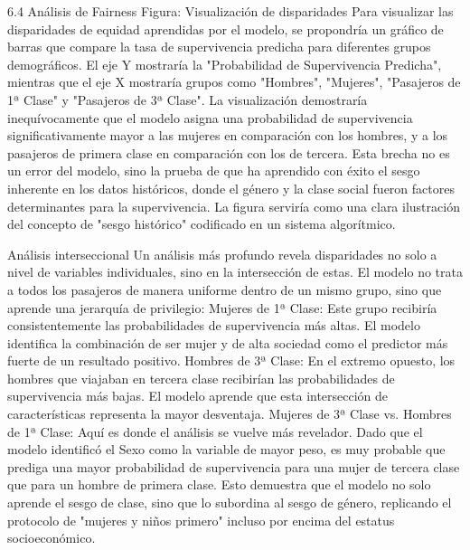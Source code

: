 \documentclass[conference]{IEEEtran}
\begin{document}
6.4 Análisis de Fairness
Figura: Visualización de disparidades
Para visualizar las disparidades de equidad aprendidas por el modelo, se propondría un gráfico de barras que compare la tasa de supervivencia predicha para diferentes grupos demográficos. El eje Y mostraría la "Probabilidad de Supervivencia Predicha", mientras que el eje X mostraría grupos como "Hombres", "Mujeres", "Pasajeros de 1ª Clase" y "Pasajeros de 3ª Clase".
La visualización demostraría inequívocamente que el modelo asigna una probabilidad de supervivencia significativamente mayor a las mujeres en comparación con los hombres, y a los pasajeros de primera clase en comparación con los de tercera. Esta brecha no es un error del modelo, sino la prueba de que ha aprendido con éxito el sesgo inherente en los datos históricos, donde el género y la clase social fueron factores determinantes para la supervivencia. La figura serviría como una clara ilustración del concepto de "sesgo histórico" codificado en un sistema algorítmico.

Análisis interseccional
Un análisis más profundo revela disparidades no solo a nivel de variables individuales, sino en la intersección de estas. El modelo no trata a todos los pasajeros de manera uniforme dentro de un mismo grupo, sino que aprende una jerarquía de privilegio:
Mujeres de 1ª Clase: Este grupo recibiría consistentemente las probabilidades de supervivencia más altas. El modelo identifica la combinación de ser mujer y de alta sociedad como el predictor más fuerte de un resultado positivo.
Hombres de 3ª Clase: En el extremo opuesto, los hombres que viajaban en tercera clase recibirían las probabilidades de supervivencia más bajas. El modelo aprende que esta intersección de características representa la mayor desventaja.
Mujeres de 3ª Clase vs. Hombres de 1ª Clase: Aquí es donde el análisis se vuelve más revelador. Dado que el modelo identificó el Sexo como la variable de mayor peso, es muy probable que prediga una mayor probabilidad de supervivencia para una mujer de tercera clase que para un hombre de primera clase. Esto demuestra que el modelo no solo aprende el sesgo de clase, sino que lo subordina al sesgo de género, replicando el protocolo de "mujeres y niños primero" incluso por encima del estatus socioeconómico.
\end{document}
